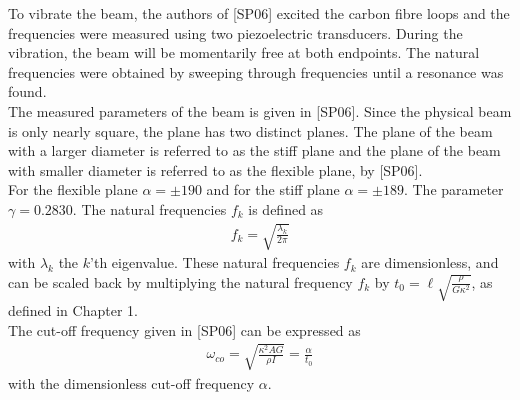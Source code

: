 \documentclass[../../main.tex]{subfiles}
\begin{document}
To vibrate the beam, the authors of [SP06] excited the carbon fibre loops and the frequencies were measured using two piezoelectric transducers. During the vibration, the beam will be momentarily free at both endpoints. The natural frequencies were obtained by sweeping through frequencies until a resonance was found.\\

The measured parameters of the beam is given in [SP06]. Since the physical beam is only nearly square, the plane has two distinct planes. The plane of the beam with a larger diameter is referred to as the stiff plane and the plane of the beam with smaller diameter is referred to as the flexible plane, by [SP06].\\

For the flexible plane $\alpha = \pm 190$ and for the stiff plane $\alpha = \pm 189$. The parameter $\gamma = 0.2830$. The natural frequencies $f_k$ is defined as 
\begin{eqnarray*}
	f_k = \sqrt{\frac{\lambda_k}{2\pi}}
\end{eqnarray*} with $\lambda_k$ the $k$'th eigenvalue. These natural frequencies $f_k$ are dimensionless, and can be scaled back by multiplying the natural frequency $f_k$ by $t_0=\ell\sqrt{\frac{\rho}{G\kappa^2}}$, as defined in Chapter 1.\\

The cut-off frequency given in [SP06] can be expressed as
\begin{eqnarray*}
	\omega_{co} = \sqrt{\frac{\kappa^2 A G}{\rho I}} = \frac{\alpha}{t_0}
\end{eqnarray*}
with the dimensionless cut-off frequency $\alpha$.
\end{document}
